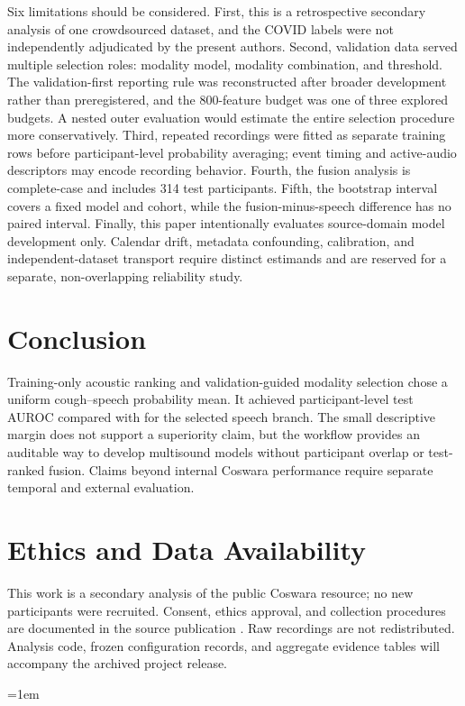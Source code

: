 \documentclass[conference]{IEEEtran}
\begin{document}
Six limitations should be considered. First, this is a retrospective secondary
analysis of one crowdsourced dataset, and the COVID labels were not independently
adjudicated by the present authors. Second, validation data served multiple
selection roles: modality model, modality combination, and threshold. The
validation-first reporting rule was reconstructed after broader development
rather than preregistered, and the 800-feature budget was one of three explored
budgets. A nested outer evaluation would estimate the entire selection procedure
more conservatively. Third, repeated recordings were fitted as separate training
rows before participant-level probability averaging; event timing and
active-audio descriptors may encode recording behavior. Fourth, the fusion
analysis is complete-case and includes 314 test participants. Fifth, the
bootstrap interval covers a fixed model and cohort, while the fusion-minus-speech
difference has no paired interval. Finally, this paper intentionally evaluates
source-domain model development only. Calendar drift, metadata confounding,
calibration, and independent-dataset transport require distinct estimands and
are reserved for a separate, non-overlapping reliability study.

\section{Conclusion}

Training-only acoustic ranking and validation-guided modality selection chose a
uniform cough--speech probability mean. It achieved participant-level test
AUROC \FusionTestAUROC{} compared with \SpeechTestAUROC{} for the selected
speech branch. The small descriptive margin does not support a superiority
claim, but the workflow provides an auditable way to develop multisound models
without participant overlap or test-ranked fusion. Claims beyond internal
Coswara performance require separate temporal and external evaluation.

\section*{Ethics and Data Availability}

This work is a secondary analysis of the public Coswara resource; no new
participants were recruited. Consent, ethics approval, and collection procedures
are documented in the source publication \cite{bhattacharya2023coswara}. Raw
recordings are not redistributed. Analysis code, frozen configuration records,
and aggregate evidence tables will accompany the archived project release.

\emergencystretch=1em


\end{document}
